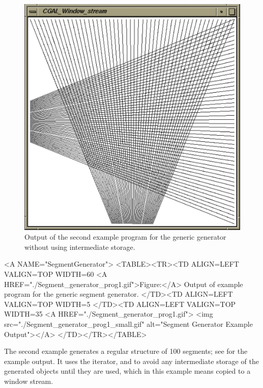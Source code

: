 \begin{ccTexOnly}
\begin{figure}
    \begin{minipage}[t]{0.45\textwidth}%
      \includegraphics[width=\textwidth]{Generator/Segment_generator_prog2}
      \caption{Output of the second example program for the generic
        generator without using intermediate storage.}
      \label{figureSegmentGeneratorFan}
    \end{minipage}%
  \end{figure}
\end{ccTexOnly}


\begin{ccHtmlOnly}
  <A NAME="SegmentGenerator">
  <TABLE><TR><TD ALIGN=LEFT VALIGN=TOP WIDTH=60%
    <A HREF="./Segment_generator_prog1.gif">Figure:</A>
    Output of example program for the generic segment generator.
  </TD><TD ALIGN=LEFT VALIGN=TOP WIDTH=5%
  </TD><TD ALIGN=LEFT VALIGN=TOP WIDTH=35%
    <A HREF="./Segment_generator_prog1.gif">
        <img src="./Segment_generator_prog1_small.gif" 
             alt="Segment Generator Example Output"></A>
  </TD></TR></TABLE>
\end{ccHtmlOnly}

The second example generates a regular structure of 100 segments; see 
 for the example
output. It uses the %
 iterator,
%
and  %
to avoid any intermediate storage of the generated objects until they are
used, which in this example means copied to a window stream.

